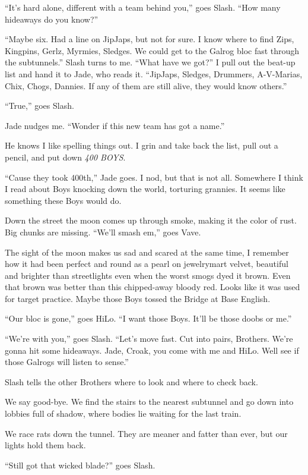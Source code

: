 ``It's hard alone, different with a team behind you,'' goes Slash. ``How many hideaways do you know?''

``Maybe six. Had a line on JipJaps, but not for sure. I know where to find Zips, Kingpins, Gerlz, Myrmies, Sledges. We could get to the Galrog bloc fast through the subtunnels.''
Slash turns to me. ``What have we got?''
I pull out the beat-up list and hand it to Jade, who reads it. ``JipJaps, Sledges, Drummers, A-V-Marias, Chix, Chogs, Dannies. If any of them are still alive, they would know others.''

``True,'' goes Slash.

Jade nudges me. ``Wonder if this new team has got a name.''

He knows I like spelling things out. I grin and take back the list, pull out a pencil, and put down \textit{400 BOYS}.

``Cause they took 400th,'' Jade goes. I nod, but that is not all. Somewhere I think I read about Boys knocking down the world, torturing grannies. It seems like something these Boys would do.

Down the street the moon comes up through smoke, making it the color of rust. Big chunks are missing.
``We'll smash em,'' goes Vave.

The sight of the moon makes us sad and scared at the same time, I remember how it had been perfect and round as a pearl on jewelrymart velvet, beautiful and brighter than streetlights even when the worst smogs dyed it brown. Even that brown was better than this chipped-away bloody red. Looks like it was used for target practice. Maybe those Boys tossed the Bridge at Base English.

``Our bloc is gone,'' goes HiLo. ``I want those Boys. It'll be those doobs or me.''

``We're with you,'' goes Slash. ``Let's move fast. Cut into pairs, Brothers. We're gonna hit some hideaways. Jade, Croak, you come with me and HiLo. Well see if those Galrogs will listen to sense.''

Slash tells the other Brothers where to look and where to check back.

We say good-bye. We find the stairs to the nearest subtunnel and go down into lobbies full of shadow, where bodies lie waiting for the last train.

We race rats down the tunnel. They are meaner and fatter than ever, but our lights hold them back.

``Still got that wicked blade?'' goes Slash.

